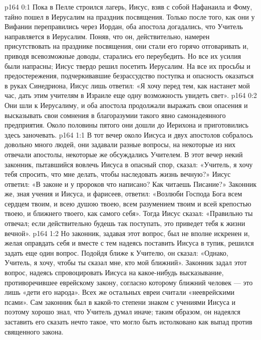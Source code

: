 \vs p164 0:1 Пока в Пелле строился лагерь, Иисус, взяв с собой Нафанаила и Фому, тайно пошел в Иерусалим на праздник посвящения. Только после того, как они у Вифании переправились через Иордан, оба апостола догадались, что Учитель направляется в Иерусалим. Поняв, что он, действительно, намерен присутствовать на празднике посвящения, они стали его горячо отговаривать и, приводя всевозможные доводы, старались его переубедить. Но все их усилия были напрасны; Иисус твердо решил посетить Иерусалим. На все их просьбы и предостережения, подчеркивавшие безрассудство поступка и опасность оказаться в руках Синедриона, Иисус лишь ответил: «Я хочу перед тем, как настанет мой час, дать этим учителям в Израиле еще одну возможность увидеть свет».
\vs p164 0:2 Они шли к Иерусалиму, и оба апостола продолжали выражать свои опасения и высказывать свои сомнения в благоразумии такого явно самонадеянного предприятия. Около половины пятого они дошли до Иерихона и приготовились здесь заночевать.
\vs p164 1:1 В тот вечер около Иисуса и двух апостолов собралось довольно много людей, они задавали разные вопросы, на некоторые из них отвечали апостолы, некоторые же обсуждались Учителем. В этот вечер некий законник, пытавшийся вовлечь Иисуса в опасный спор, сказал: «Учитель, я хочу тебя спросить, что мне делать, чтобы наследовать жизнь вечную?» Иисус ответил: «В законе и у пророков что написано? Как читаешь Писание?» Законник же, зная учения и Иисуса, и фарисеев, ответил: «Возлюби Господа Бога всем сердцем твоим, и всею душою твоею, всем разумением твоим и всей крепостью твоею, и ближнего твоего, как самого себя». Тогда Иисус сказал: «Правильно ты отвечал; если действительно будешь так поступать, это приведет тебя к жизни вечной».
\vs p164 1:2 Но законник, задавая этот вопрос, был не вполне искренен и, желая оправдать себя и вместе с тем надеясь поставить Иисуса в тупик, решился задать еще один вопрос. Подойдя ближе к Учителю, он сказал: «Однако, Учитель, я хочу, чтобы ты сказал мне, кто мой ближний». Законник задал этот вопрос, надеясь спровоцировать Иисуса на какое\hyp{}нибудь высказывание, противоречившее еврейскому закону, согласно которому ближний человек --- это лишь «дети его народа». Всех же остальных евреи считали «нееврейскими псами». Сам законник был в какой\hyp{}то степени знаком с учениями Иисуса и поэтому хорошо знал, что Учитель думал иначе; таким образом, он надеялся заставить его сказать нечто такое, что могло быть истолковано как выпад против священного закона.
